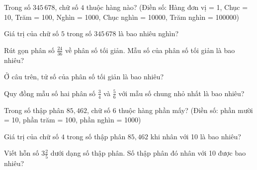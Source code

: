 
\begin{ex}
  Trong số $345\,678$, chữ số $4$ thuộc hàng nào? (Điền số: Hàng đơn vị = 1, Chục = 10, Trăm = 100, Nghìn = 1000, Chục nghìn = 10000, Trăm nghìn = 100000)
\end{ex}

\begin{ex}
  Giá trị của chữ số $5$ trong số $345\,678$ là bao nhiêu nghìn?
\end{ex}

\begin{ex}
  Rút gọn phân số $\frac{24}{36}$ về phân số tối giản. Mẫu số của phân số tối giản là bao nhiêu?
\end{ex}

\begin{ex}
  Ở câu trên, tử số của phân số tối giản là bao nhiêu?
\end{ex}

\begin{ex}
  Quy đồng mẫu số hai phân số $\frac{3}{4}$ và $\frac{5}{6}$ với mẫu số chung nhỏ nhất là bao nhiêu?
\end{ex}

\begin{ex}
  Trong số thập phân $85{,}462$, chữ số $6$ thuộc hàng phần mấy? (Điền số: phần mười = 10, phần trăm = 100, phần nghìn = 1000)
\end{ex}

\begin{ex}
  Giá trị của chữ số $4$ trong số thập phân $85{,}462$ khi nhân với 10 là bao nhiêu?
\end{ex}

\begin{ex}
  Viết hỗn số $3\frac{2}{5}$ dưới dạng số thập phân. Số thập phân đó nhân với 10 được bao nhiêu?
\end{ex}

